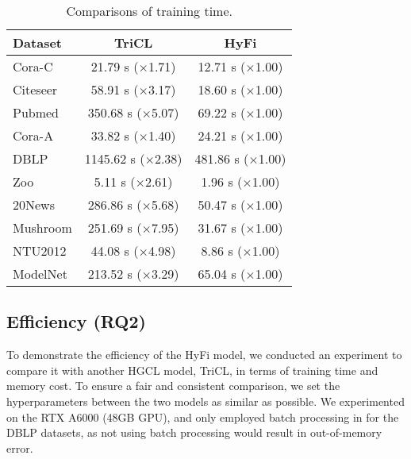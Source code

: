 \begin{table}[t!]
\centering
\caption{Comparisons of training time.}
\label{tab:speed}
\begin{tabular}{lcc}
\hline
Dataset & TriCL & HyFi \\
\hline
\hline
Cora-C & 21.79 s ($\times$1.71) & 12.71 s ($\times$1.00)\\
Citeseer & 58.91 s ($\times$3.17) & 18.60 s ($\times$1.00)\\
Pubmed & 350.68 s ($\times$5.07) & 69.22 s ($\times$1.00)\\
Cora-A & 33.82 s ($\times$1.40) & 24.21 s ($\times$1.00)\\
DBLP & 1145.62 s ($\times$2.38) & 481.86 s ($\times$1.00)\\
Zoo & 5.11 s ($\times$2.61) & 1.96 s ($\times$1.00)\\
20News & 286.86 s ($\times$5.68) & 50.47 s ($\times$1.00)\\
Mushroom & 251.69 s ($\times$7.95) & 31.67 s ($\times$1.00)\\
NTU2012 & 44.08 s ($\times$4.98) & 8.86 s ($\times$1.00)\\
ModelNet & 213.52 s ($\times$3.29) & 65.04 s ($\times$1.00)\\
\hline
\end{tabular}
\end{table}

\subsection{Efficiency (RQ2)}

To demonstrate the efficiency of the HyFi model, we conducted an experiment to compare it with another HGCL model, TriCL, in terms of training time and memory cost. To ensure a fair and consistent comparison, we set the hyperparameters between the two models as similar as possible. We experimented on the RTX A6000 (48GB GPU), and only employed batch processing in for the DBLP datasets, as not using batch processing would result in out-of-memory error.


